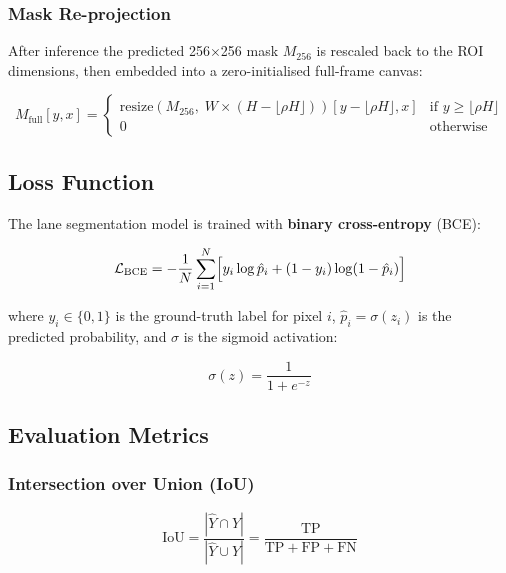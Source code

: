 \documentclass[12pt, a4paper]{article}
\begin{document}
\subsubsection{Mask Re-projection}

After inference the predicted 256$\times$256 mask $M_{256}$ is rescaled
back to the ROI dimensions, then embedded into a zero-initialised
full-frame canvas:

\begin{equation}
  M_{\text{full}}[y, x] =
  \begin{cases}
    \text{resize}(M_{256},\; W \times (H - \lfloor\rho H\rfloor))[y - \lfloor\rho H\rfloor, x]
      & \text{if } y \geq \lfloor\rho H\rfloor \\
    0 & \text{otherwise}
  \end{cases}
  \label{eq:reproject}
\end{equation}

\subsection{Loss Function}

The lane segmentation model is trained with \textbf{binary cross-entropy}
(BCE):

\begin{equation}
  \mathcal{L}_{\text{BCE}}
  = -\frac{1}{N} \sum_{i=1}^{N}
    \Bigl[
      y_i \log \hat{p}_i + (1 - y_i) \log(1 - \hat{p}_i)
    \Bigr]
  \label{eq:bce}
\end{equation}

where $y_i \in \{0,1\}$ is the ground-truth label for pixel $i$,
$\hat{p}_i = \sigma(z_i)$ is the predicted probability, and $\sigma$
is the sigmoid activation:

\begin{equation}
  \sigma(z) = \frac{1}{1 + e^{-z}}
  \label{eq:sigmoid}
\end{equation}

\subsection{Evaluation Metrics}

\subsubsection{Intersection over Union (IoU)}

\begin{equation}
  \text{IoU}
  = \frac{|\hat{Y} \cap Y|}{|\hat{Y} \cup Y|}
  = \frac{\text{TP}}{\text{TP} + \text{FP} + \text{FN}}
  \label{eq:iou}
\end{equation}
\end{document}
